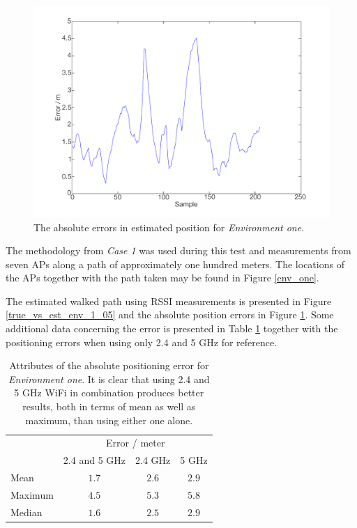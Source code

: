\documentclass{LTHthesis}
\begin{document}
%
\begin{figure}[!hbt]

\includegraphics[width=1\textwidth ]{images/pure_rssi/error_env_1_05}
\caption{The absolute errors in estimated position for \emph{Environment one}.}\label{error_env_1_05}
\end{figure}
%
The methodology from \emph{Case 1} was used during this test and measurements from seven APs along a path of approximately one hundred meters. The locations of the APs together with the path taken may be found in Figure \ref{env_one}.

The estimated walked path using RSSI measurements is presented in Figure \ref{true_vs_est_env_1_05} and the absolute position errors in Figure \ref{error_env_1_05}. Some additional data concerning the error is presented in Table \ref{table:error_env-1} together with the positioning errors when using only 2.4 and 5 GHz for reference.
%
\begin{table}[!hbt]
\begin{center}
\begin{tabular}{|l|c|c|c|}
\cline{2-4}
\multicolumn{1}{c|}{} & \multicolumn{3}{c|}{Error / meter} \\
\cline{2-4}
\multicolumn{1}{c|}{} & 2.4 and 5 GHz & 2.4 GHz & 5 GHz \\
\hline
Mean & $1.7$ & $2.6$ & $2.9$ \\
\hline
Maximum & $4.5$ & $5.3$ & $5.8$\\
\hline
Median & $1.6$ & $2.5$ & $2.9$ \\
\hline 
\end{tabular}
\end{center}
\caption{Attributes of the absolute positioning error for \emph{Environment one}. It is clear that using 2.4 and 5 GHz WiFi in combination produces better results, both in terms of mean as well as maximum, than using either one alone.}\label{table:error_env-1}
\end{table}
\end{document}
